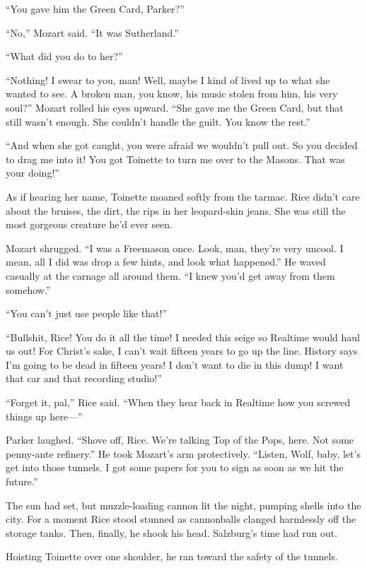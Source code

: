 “You gave him the Green Card, Parker?”

“No,” Mozart said. “It was Sutherland.”

“What did you do to her?”

“Nothing! I swear to you, man! Well, maybe I kind of lived up to what she wanted to see. A broken man, you know, his music stolen from him, his very soul?” Mozart rolled his eyes upward. “She gave me the Green Card, but that still wasn’t enough. She couldn’t handle the guilt. You know the rest.”

“And when she got caught, you were afraid we wouldn’t pull out. So you decided to drag me into it! You got Toinette to turn me over to the Masons. That was your doing!”

As if hearing her name, Toinette moaned softly from the tarmac. Rice didn’t care about the bruises, the dirt, the rips in her leopard-skin jeans. She was still the most gorgeous creature he’d ever seen.

Mozart shrugged. “I was a Freemason once. Look, man, they’re very uncool. I mean, all I did was drop a few hints, and look what happened.” He waved casually at the carnage all around them. “I knew you’d get away from them somehow.”

“You can’t just use people like that!”

“Bullshit, Rice! You do it all the time! I needed this seige so Realtime would haul us out! For Christ’s sake, I can’t wait fifteen years to go up the line. History says I’m going to be dead in fifteen years! I don’t want to die in this dump! I want that car and that recording studio!”

“Forget it, pal,” Rice said. “When they hear back in Realtime how you screwed things up here—”

Parker laughed. “Shove off, Rice. We’re talking Top of the Pops, here. Not some penny-ante refinery.” He took Mozart’s arm protectively. “Listen, Wolf, baby, let’s get into those tunnels. I got some papers for you to sign as soon as we hit the future.”

The sun had set, but muzzle-loading cannon lit the night, pumping shells into the city. For a moment Rice stood stunned as cannonballs clanged harmlessly off the storage tanks. Then, finally, he shook his head. Salzburg’s time had run out.

Hoisting Toinette over one shoulder, he ran toward the safety of the tunnels.